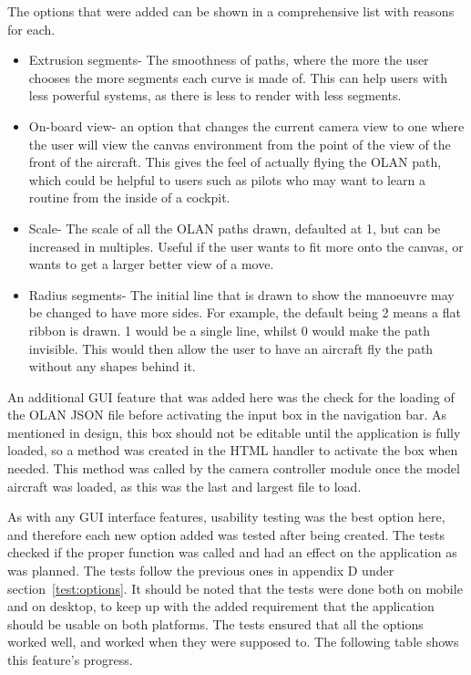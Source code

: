 The options that were added can be shown in a comprehensive list with reasons for each.
\begin{itemize}
  \item Extrusion segments- The smoothness of paths, where the more the user chooses the more segments each curve is made of. This can help users with less powerful systems, as there is less to render with less segments.
  \item On-board view- an option that changes the current camera view to one where the user will view the canvas environment from the point of the view of the front of the aircraft. This gives the feel of actually flying the OLAN path, which could be helpful to users such as pilots who may want to learn a routine from the inside of a cockpit.
  \item Scale- The scale of all the OLAN paths drawn, defaulted at 1, but can be increased in multiples. Useful if the user wants to fit more onto the canvas, or wants to get a larger better view of a move.
  \item Radius segments- The initial line that is drawn to show the manoeuvre may be changed to have more sides. For example, the default being 2 means a flat ribbon is drawn. 1 would be a single line, whilst 0 would make the path invisible. This would then allow the user to have an aircraft fly the path without any shapes behind it.
\end{itemize}

An additional GUI feature that was added here was the check for the loading of the OLAN JSON file before activating the input box in the navigation bar. As mentioned in design, this box should not be editable until the application is fully loaded, so a method was created in the HTML handler to activate the box when needed. This method was called by the camera controller module once the model aircraft was loaded, as this was the last and largest file to load.

As with any GUI interface features, usability testing was the best option here, and therefore each new option added was tested after being created. The tests checked if the proper function was called and had an effect on the application as was planned. The tests follow the previous ones in appendix D under section~\ref{test:options}. It should be noted that the tests were done both on mobile and on desktop, to keep up with the added requirement that the application should be usable on both platforms. The tests ensured that all the options worked well, and worked when they were supposed to. The following table shows this feature's progress.

